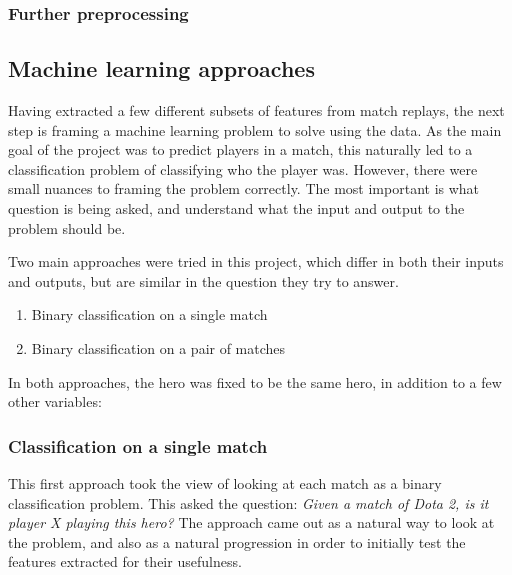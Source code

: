 \documentclass[Report.tex]{subfiles}
\begin{document}
\subsubsection{Further preprocessing}



\subsection{Machine learning approaches}
Having extracted a few different subsets of features from match replays, the next step is framing a machine learning problem to solve using the data. As the main goal of the project was to predict players in a match, this naturally led to a classification problem of classifying who the player was. However, there were small nuances to framing the problem correctly. The most important is what question is being asked, and understand what the input and output to the problem should be.

Two main approaches were tried in this project, which differ in both their inputs and outputs, but are similar in the question they try to answer.
\begin{enumerate}
\item Binary classification on a single match
\item Binary classification on a pair of matches
\end{enumerate}

In both approaches, the hero was fixed to be the same hero, in addition to a few other variables:

\subsubsection{Classification on a single match}
This first approach took the view of looking at each match as a binary classification problem. This asked the question: \textit{Given a match of Dota 2, is it player X playing this hero?} The approach came out as a natural way to look at the problem, and also as a natural progression in order to initially test the features extracted for their usefulness.
\end{document}
